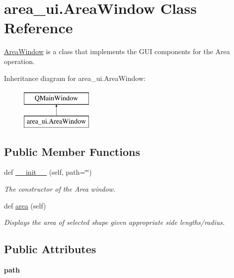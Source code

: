 \hypertarget{classarea__ui_1_1_area_window}{}\section{area\+\_\+ui.\+Area\+Window Class Reference}
\label{classarea__ui_1_1_area_window}


\hyperlink{classarea__ui_1_1_area_window}{Area\+Window} is a class that implements the G\+UI components for the Area operation.  


Inheritance diagram for area\+\_\+ui.\+Area\+Window\+:\begin{figure}[H]
\begin{center}
\leavevmode
\includegraphics[height=2.000000cm]{classarea__ui_1_1_area_window}
\end{center}
\end{figure}
\subsection*{Public Member Functions}
\begin{DoxyCompactItemize}
\item 
def \hyperlink{classarea__ui_1_1_area_window_a4147cce2b2137dde0a7ac73901b8d9a4}{\+\_\+\+\_\+init\+\_\+\+\_\+} (self, path=\char`\"{}\char`\"{})
\begin{DoxyCompactList}\small\item\em The constructor of the Area window. \end{DoxyCompactList}\item 
def \hyperlink{classarea__ui_1_1_area_window_af95844b38370da348b28e9b1238467ad}{area} (self)
\begin{DoxyCompactList}\small\item\em Displays the area of selected shape given appropriate side lengths/radius. \end{DoxyCompactList}\end{DoxyCompactItemize}
\subsection*{Public Attributes}
\begin{DoxyCompactItemize}
\item 
\mbox{\label{classarea__ui_1_1_area_window_a78ffcbed4656d6e098b73228423db2f8}} 
{\bfseries path}
\end{DoxyCompactItemize}


